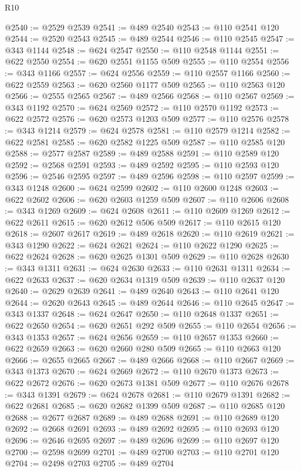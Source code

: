 \begin{lexlean}{R10}
\begin{coremodule}
@2540 := @2529 @2539
@2541 := @489 @2540
@2543 := @110 @2541 @120
@2544 := @2520 @2543
@2545 := @489 @2544
@2546 := @110 @2545
@2547 := @343 @1144
@2548 := @624 @2547
@2550 := @110 @2548 @1144
@2551 := @622 @2550
@2554 := @620 @2551 @1155 @509
@2555 := @110 @2554
@2556 := @343 @1166
@2557 := @624 @2556
@2559 := @110 @2557 @1166
@2560 := @622 @2559
@2563 := @620 @2560 @1177 @509
@2565 := @110 @2563 @120
@2566 := @2555 @2565
@2567 := @489 @2566
@2568 := @110 @2567
@2569 := @343 @1192
@2570 := @624 @2569
@2572 := @110 @2570 @1192
@2573 := @622 @2572
@2576 := @620 @2573 @1203 @509
@2577 := @110 @2576
@2578 := @343 @1214
@2579 := @624 @2578
@2581 := @110 @2579 @1214
@2582 := @622 @2581
@2585 := @620 @2582 @1225 @509
@2587 := @110 @2585 @120
@2588 := @2577 @2587
@2589 := @489 @2588
@2591 := @110 @2589 @120
@2592 := @2568 @2591
@2593 := @489 @2592
@2595 := @110 @2593 @120
@2596 := @2546 @2595
@2597 := @489 @2596
@2598 := @110 @2597
@2599 := @343 @1248
@2600 := @624 @2599
@2602 := @110 @2600 @1248
@2603 := @622 @2602
@2606 := @620 @2603 @1259 @509
@2607 := @110 @2606
@2608 := @343 @1269
@2609 := @624 @2608
@2611 := @110 @2609 @1269
@2612 := @622 @2611
@2615 := @620 @2612 @506 @509
@2617 := @110 @2615 @120
@2618 := @2607 @2617
@2619 := @489 @2618
@2620 := @110 @2619
@2621 := @343 @1290
@2622 := @624 @2621
@2624 := @110 @2622 @1290
@2625 := @622 @2624
@2628 := @620 @2625 @1301 @509
@2629 := @110 @2628
@2630 := @343 @1311
@2631 := @624 @2630
@2633 := @110 @2631 @1311
@2634 := @622 @2633
@2637 := @620 @2634 @1319 @509
@2639 := @110 @2637 @120
@2640 := @2629 @2639
@2641 := @489 @2640
@2643 := @110 @2641 @120
@2644 := @2620 @2643
@2645 := @489 @2644
@2646 := @110 @2645
@2647 := @343 @1337
@2648 := @624 @2647
@2650 := @110 @2648 @1337
@2651 := @622 @2650
@2654 := @620 @2651 @292 @509
@2655 := @110 @2654
@2656 := @343 @1353
@2657 := @624 @2656
@2659 := @110 @2657 @1353
@2660 := @622 @2659
@2663 := @620 @2660 @280 @509
@2665 := @110 @2663 @120
@2666 := @2655 @2665
@2667 := @489 @2666
@2668 := @110 @2667
@2669 := @343 @1373
@2670 := @624 @2669
@2672 := @110 @2670 @1373
@2673 := @622 @2672
@2676 := @620 @2673 @1381 @509
@2677 := @110 @2676
@2678 := @343 @1391
@2679 := @624 @2678
@2681 := @110 @2679 @1391
@2682 := @622 @2681
@2685 := @620 @2682 @1399 @509
@2687 := @110 @2685 @120
@2688 := @2677 @2687
@2689 := @489 @2688
@2691 := @110 @2689 @120
@2692 := @2668 @2691
@2693 := @489 @2692
@2695 := @110 @2693 @120
@2696 := @2646 @2695
@2697 := @489 @2696
@2699 := @110 @2697 @120
@2700 := @2598 @2699
@2701 := @489 @2700
@2703 := @110 @2701 @120
@2704 := @2498 @2703
@2705 := @489 @2704

\end{coremodule}
\end{lexlean}
